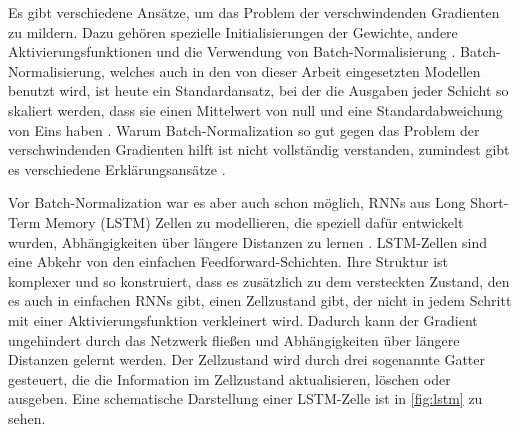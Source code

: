 Es gibt verschiedene Ansätze, um das Problem der verschwindenden Gradienten zu mildern.
Dazu gehören spezielle Initialisierungen der Gewichte, andere Aktivierungsfunktionen und die Verwendung von Batch-Normalisierung \cite{vanishing_gradients}.
Batch-Normalisierung, welches auch in den von dieser Arbeit eingesetzten Modellen benutzt wird, ist heute ein Standardansatz, bei der die Ausgaben jeder Schicht so skaliert werden, dass sie einen Mittelwert von null und eine Standardabweichung von Eins haben \cite{batch_normalization}.
Warum Batch-Normalization so gut gegen das Problem der verschwindenden Gradienten hilft ist nicht vollständig verstanden, zumindest gibt es verschiedene Erklärungsansätze \cite{batch_normalization,batch_norm_reason_1,batch_norm_reason_2}.

Vor Batch-Normalization war es aber auch schon möglich, RNNs aus \foreignlanguage{english}{Long Short-Term Memory} (LSTM) Zellen zu modellieren, die speziell dafür entwickelt wurden, Abhängigkeiten über längere Distanzen zu lernen \cite{lstm}.
LSTM-Zellen sind eine Abkehr von den einfachen Feedforward-Schichten.
Ihre Struktur ist komplexer und so konstruiert, dass es zusätzlich zu dem versteckten Zustand, den es auch in einfachen RNNs gibt, einen Zellzustand gibt, der nicht in jedem Schritt mit einer Aktivierungsfunktion verkleinert wird.
Dadurch kann der Gradient ungehindert durch das Netzwerk \glqq fließen\grqq{} und Abhängigkeiten über längere Distanzen gelernt werden.
Der Zellzustand wird durch drei sogenannte \glqq Gatter\grqq{} gesteuert, die die Information im Zellzustand aktualisieren, löschen oder ausgeben.
Eine schematische Darstellung einer LSTM-Zelle ist in \ref{fig:lstm} zu sehen.

